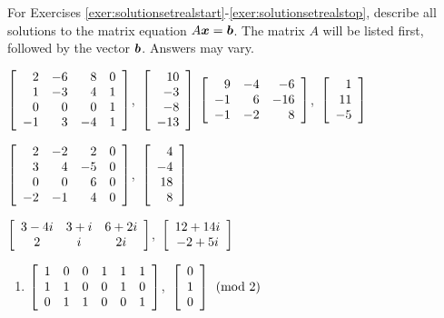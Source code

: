 \noindent For Exercises \ref{exer:solutionsetrealstart}-\ref{exer:solutionsetrealstop}, describe all solutions to the matrix equation $A\bb x= \bb b$. The matrix $A$ will be listed first, followed by the vector $\bb b$. Answers may vary.
\begin{enumerate}[!HW!]
\begin{multicols}{2}
\item \label{exer:solutionsetrealstart} $\mtx{rrrr}{2&-6&8&0\\1&-3&4&1\\0&0&0&1\\-1&3&-4&1}$,\ $\vr{10\\-3\\-8\\-13}$
\itemspade $\mtx{rrr}{9&-4&-6\\-1&6&-16\\-1&-2&8}$,\ $\vr{1\\11\\-5}$
\end{multicols}
\begin{multicols}{2}
\itemspade $\mtx{rrrr}{2&-2&2&0\\3&4&-5&0\\0&0&6&0\\-2&-1&4&0}$,\ $\vr{4\\-4\\18\\8}$


\itemspade $\mtx{ccc}{3-4i&3+i&6+2i\\2&i&2i}$,\ $\mtx{c}{12+14i\\-2+5i}$
\end{multicols}
\end{enumerate}
\begin{enumerate}[!HW!, label=$\spadesuit$ \arabic*., ref=\arabic*]
\item\label{exer:solutionsetrealstop} $\mtx{rrrrrr}{1&0&0&1&1&1\\1&1&0&0&1&0\\0&1&1&0&0&1}$,\ $\vr{0\\1\\0} \pmod 2$
\end{enumerate}

